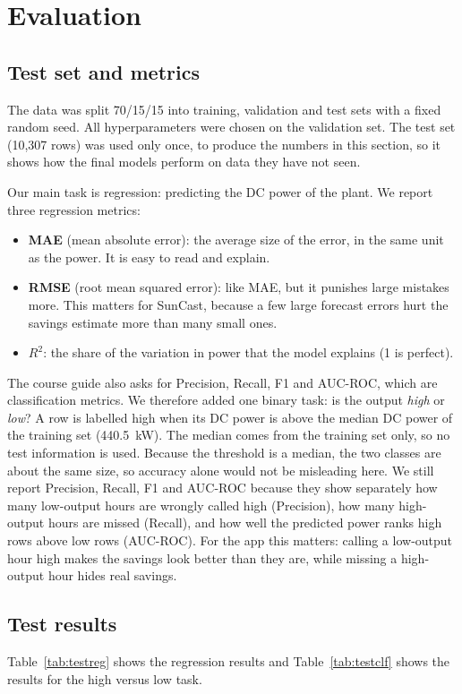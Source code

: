 \section{Evaluation}

\subsection{Test set and metrics}
The data was split 70/15/15 into training, validation and test sets with a fixed random seed. All hyperparameters were chosen on the validation set. The test set (10,307 rows) was used only once, to produce the numbers in this section, so it shows how the final models perform on data they have not seen.

Our main task is regression: predicting the DC power of the plant. We report three regression metrics:
\begin{itemize}
    \item \textbf{MAE} (mean absolute error): the average size of the error, in the same unit as the power. It is easy to read and explain.
    \item \textbf{RMSE} (root mean squared error): like MAE, but it punishes large mistakes more. This matters for SunCast, because a few large forecast errors hurt the savings estimate more than many small ones.
    \item \textbf{$R^2$}: the share of the variation in power that the model explains (1 is perfect).
\end{itemize}

The course guide also asks for Precision, Recall, F1 and AUC-ROC, which are classification metrics. We therefore added one binary task: is the output \emph{high} or \emph{low}? A row is labelled high when its DC power is above the median DC power of the training set (440.5~kW). The median comes from the training set only, so no test information is used. Because the threshold is a median, the two classes are about the same size, so accuracy alone would not be misleading here. We still report Precision, Recall, F1 and AUC-ROC because they show separately how many low-output hours are wrongly called high (Precision), how many high-output hours are missed (Recall), and how well the predicted power ranks high rows above low rows (AUC-ROC). For the app this matters: calling a low-output hour high makes the savings look better than they are, while missing a high-output hour hides real savings.

\subsection{Test results}
Table~\ref{tab:testreg} shows the regression results and Table~\ref{tab:testclf} shows the results for the high versus low task.

